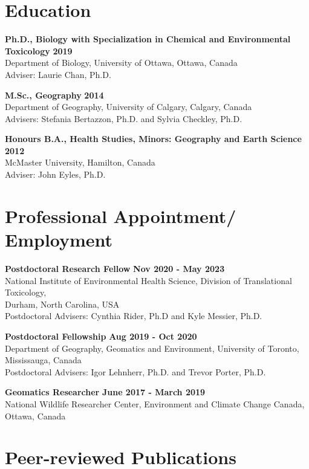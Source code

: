 \documentclass[margin,line]{res}
\begin{document}
\begin{resume}
\section{\sc Education}

\textbf{Ph.D., Biology with Specialization in Chemical and Environmental Toxicology} \hfill {\bf 2019}\\
Department of Biology, University of Ottawa, Ottawa, Canada \\
Adviser: Laurie Chan, Ph.D.

\textbf{M.Sc., Geography}  \hfill {\bf 2014}\\
Department of Geography, University of Calgary, Calgary, Canada\\
Advisers:  Stefania Bertazzon, Ph.D. and Sylvia Checkley, Ph.D.

\textbf{Honours B.A., Health Studies, Minors: Geography and Earth Science }\hfill {\bf 2012}\\
McMaster University, Hamilton, Canada\\
Adviser: John Eyles, Ph.D.

\vspace*{.1in}
\section{\sc Professional Appointment/ Employment}

{\bf  Postdoctoral Research Fellow} \hfill {\bf Nov 2020 - May 2023}\\
National Institute of Environmental Health Science, Division of Translational Toxicology,\\
Durham, North Carolina, USA\\
Postdoctoral Advisers: Cynthia Rider, Ph.D and Kyle Messier, Ph.D.

{\bf Postdoctoral Fellowship} \hfill {\bf Aug 2019 - Oct 2020}\\
Department of Geography, Geomatics and Environment, University of Toronto, Mississauga, Canada\\
Postdoctoral Advisers: Igor Lehnherr, Ph.D. and Trevor Porter, Ph.D.

{\bf Geomatics Researcher} \hfill {\bf June 2017 - March 2019}\\
National Wildlife Researcher Center, Environment and Climate Change Canada, Ottawa, Canada
\vspace*{.1in}

\section{\sc Peer-reviewed Publications}


\end{resume}
\end{document}

